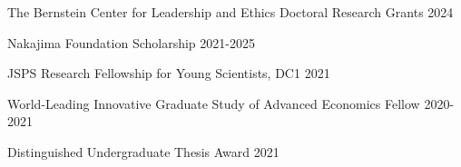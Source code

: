 
\begin{cventries}

\cventrysimple
    {The Bernstein Center for Leadership and Ethics Doctoral Research Grants}  %
    {2024} %
    {}
	
\cventrysimple
    {Nakajima Foundation Scholarship}  %
    {2021-2025} %
    {}
	
\cventrysimple
	{JSPS Research Fellowship for Young Scientists, DC1}  %
    {2021} %
    {}

\cventrysimple
	{World-Leading Innovative Graduate Study of Advanced Economics Fellow}  %
    {2020-2021} %
    {}

\cventrysimple
    {Distinguished Undergraduate Thesis Award}  %
    {2021} %
    {}


\end{cventries}
